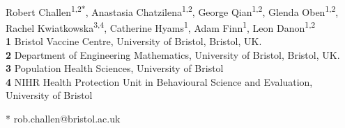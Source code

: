 \documentclass[10pt,letterpaper]{article}
\begin{document}
\vspace*{0.2in}

\begin{flushleft}
{\Large
\textbf{} %
}
\newline
\\
Robert Challen\textsuperscript{1,2*},
Anastasia Chatzilena\textsuperscript{1,2},
George Qian\textsuperscript{1,2},
Glenda Oben\textsuperscript{1,2},
Rachel Kwiatkowska\textsuperscript{3,4},
Catherine Hyams\textsuperscript{1},
Adam Finn\textsuperscript{1},
Leon Danon\textsuperscript{1,2}
\\
\bigskip
\textbf{1} Bristol Vaccine Centre, University of Bristol, Bristol, UK.\\
\textbf{2} Department of Engineering Mathematics, University of Bristol, Bristol, UK.\\
\textbf{3} Population Health Sciences, University of Bristol\\
\textbf{4} NIHR Health Protection Unit in Behavioural Science and Evaluation, University of Bristol\\
\bigskip

%
%





* rob.challen@bristol.ac.uk

\end{flushleft}
\end{document}
